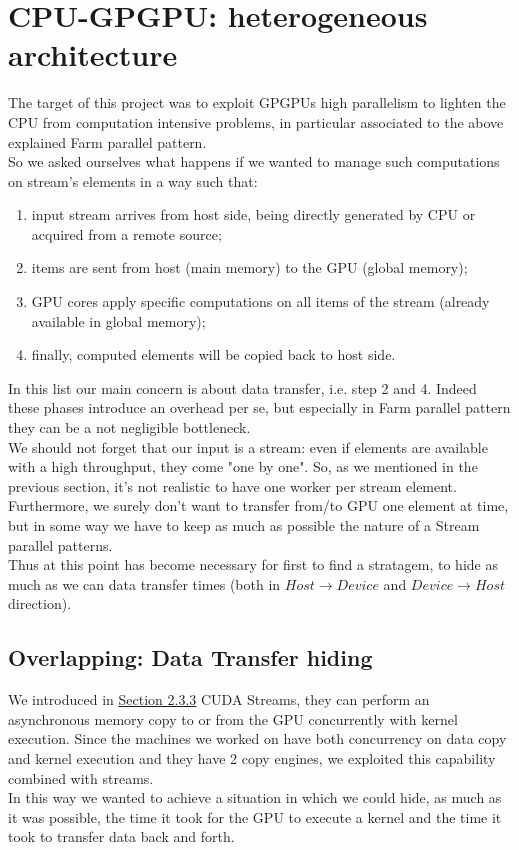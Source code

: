 \section{CPU-GPGPU: heterogeneous architecture}
The target of this project was to exploit GPGPUs high parallelism to lighten the CPU from computation intensive problems, in particular associated to the above explained Farm parallel pattern.\\
So we asked ourselves what happens if we wanted to manage such computations on stream's elements in a way such that:
\begin{enumerate}
	\item input stream arrives from host side, being directly generated by CPU or acquired from a remote source;
	
	\item items are sent from host (main memory) to the GPU (global memory);
	
	\item GPU cores apply specific computations on all items of the stream (already available in global memory);
	
	\item finally, computed elements will be copied back to host side. \\

\end{enumerate}

	In this list our main concern is about data transfer, i.e. step 2 and 4. 
	Indeed these phases introduce an overhead per se, but especially in Farm parallel pattern they can be a not negligible bottleneck.\\
	We should not forget that our input is a stream: even if elements are available with a high throughput, they come "one by one".
	So, as we mentioned in the previous section, it's not realistic to have one worker per stream element.
	Furthermore, we surely don't want to transfer from/to GPU one element at time, but in some way we have to keep as much as possible the nature of a Stream parallel patterns.\\
	
	Thus at this point has become necessary for first to find a stratagem, to hide as much as we can data transfer times (both in  \(Host \rightarrow Device\)  and  \(Device \rightarrow Host\)  direction).
	
	\subsection{Overlapping: Data Transfer hiding}
	We introduced in  \hyperref[subs:stream]{Section 2.3.3} CUDA Streams, they can perform an asynchronous memory copy to or from the GPU
	concurrently with kernel execution. 
	Since the machines we worked on have both concurrency on data copy and kernel execution and they have 2 copy engines, we exploited this capability  combined with streams.\\
	In this way we wanted to achieve a situation in which we could hide, as much as it was possible, the time it took for the GPU to execute a kernel and the time it took to transfer data back and forth.\\
	
